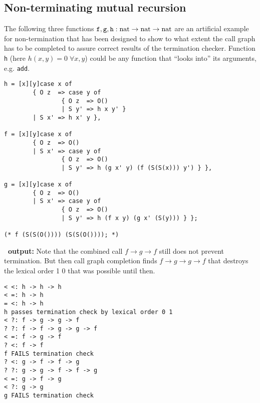 \subsection{Non-terminating mutual recursion}
The following three functions $\mathtt{f}, \mathtt{g}, \mathtt{h} :
\mathrm{nat} \rightarrow \mathrm{nat} \rightarrow \mathrm{nat}$ are
an artificial example for non-termination that has been designed to
show to what extent the call graph has to be completed to assure
correct results of the termination checker. Function {\tt h}
(here $h(x,y)=0 \;\forall
x, y$) could be any function
that ``looks into'' its arguments, e.g. {\tt add}.
\begin{verbatim}
h = [x][y]case x of
        { O z  => case y of
                { O z  => O()
                | S y' => h x y' }
        | S x' => h x' y },

f = [x][y]case x of
        { O z  => O()
        | S x' => case y of
                { O z  => O()
                | S y' => h (g x' y) (f (S(S(x))) y') } },

g = [x][y]case x of
        { O z  => O()
        | S x' => case y of
                { O z  => O()
                | S y' => h (f x y) (g x' (S(y))) } };

(* f (S(S(O()))) (S(S(O()))); *)
\end{verbatim}
{\bf \foetus\ output:} Note that the combined call $f \rightarrow g
\rightarrow f$ still does not prevent termination. But then call graph
completion finds $f \rightarrow g \rightarrow g \rightarrow f$ that
destroys the lexical order 1 0 that was possible until then.
\begin{verbatim}
< <: h -> h -> h
< =: h -> h
= <: h -> h
h passes termination check by lexical order 0 1
< ?: f -> g -> g -> f
? ?: f -> f -> g -> g -> f
< =: f -> g -> f
? <: f -> f
f FAILS termination check
? <: g -> f -> f -> g
? ?: g -> g -> f -> f -> g
< =: g -> f -> g
< ?: g -> g
g FAILS termination check
\end{verbatim}

